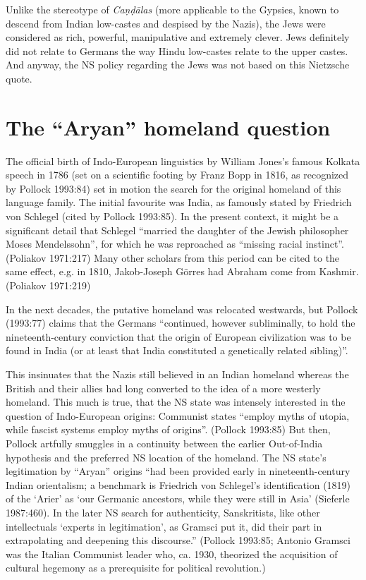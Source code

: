 Unlike the stereotype of {\sl Caṇḍālas} (more applicable to the Gypsies, known to descend from Indian low-castes and despised by the Nazis), the Jews were considered as rich, powerful, manipulative and extremely clever. Jews definitely did not relate to Germans the way Hindu low-castes relate to the upper castes. And anyway, the NS policy regarding the Jews was not based on this Nietzsche quote.

\section*{The “Aryan” homeland question}

The official birth of Indo-European linguistics by William Jones’s famous Kolkata speech in 1786 (set on a scientific footing by Franz Bopp in 1816, as recognized by Pollock 1993:84) set in motion the search for the original homeland of this language family. The initial favourite was India, as famously stated by Friedrich von Schlegel (cited by Pollock 1993:85). In the present context, it might be a significant detail that Schlegel “married the daughter of the Jewish philosopher Moses Mendelssohn”, for which he was reproached as “missing racial instinct”. (Poliakov 1971:217) Many other scholars from this period can be cited to the same effect, e.g. in 1810, Jakob-Joseph Görres had Abraham come from Kashmir. (Poliakov 1971:219)

In the next decades, the putative homeland was relocated westwards, but Pollock (1993:77) claims that the Germans “continued, however subliminally, to hold the nineteenth-century conviction that the origin of European civilization was to be found in India (or at least that India constituted a genetically related sibling)”. 

This insinuates that the Nazis still believed in an Indian homeland whereas the British and their allies had long converted to the idea of a more westerly homeland. This much is true, that the NS state was intensely interested in the question of Indo-European origins: Communist states “employ myths of utopia, while fascist systems employ myths of origins”. (Pollock 1993:85) But then, Pollock artfully smuggles in a continuity between the earlier Out-of-India hypothesis and the preferred NS location of the homeland. The NS state’s legitimation by “Aryan” origins “had been provided early in nineteenth-century Indian orientalism; a benchmark is Friedrich von Schlegel's identification (1819) of the ‘Arier’ as ‘our Germanic ancestors, while they were still in Asia’ (Sieferle 1987:460). In the later NS search for authenticity, Sanskritists, like other intellectuals ‘experts in legitimation’, as Gramsci put it, did their part in extrapolating and deepening this discourse.” (Pollock 1993:85; Antonio Gramsci was the Italian Communist leader who, ca. 1930, theorized the acquisition of cultural hegemony as a prerequisite for political revolution.)

